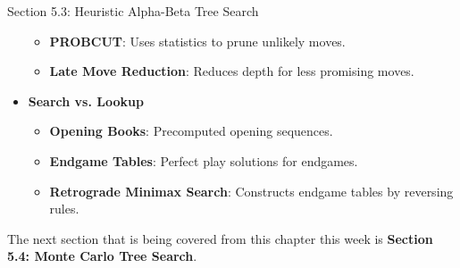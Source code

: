 \begin{notes}{Section 5.3: Heuristic Alpha-Beta Tree Search}
\begin{highlight}
\begin{itemize}
\begin{itemize}
                    \item \textbf{PROBCUT}: Uses statistics to prune unlikely moves.
                    \item \textbf{Late Move Reduction}: Reduces depth for less promising moves.
                \end{itemize}
            \item \textbf{Search vs. Lookup}
                \begin{itemize}
                    \item \textbf{Opening Books}: Precomputed opening sequences.
                    \item \textbf{Endgame Tables}: Perfect play solutions for endgames.
                    \item \textbf{Retrograde Minimax Search}: Constructs endgame tables by reversing rules.
                \end{itemize}
        \end{itemize}
    \end{highlight}
\end{notes}

The next section that is being covered from this chapter this week is \textbf{Section 5.4: Monte Carlo Tree Search}.

